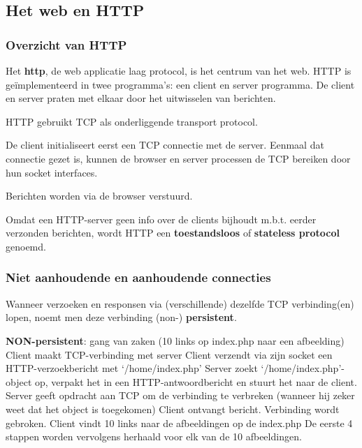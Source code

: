 \subsection{Het web en HTTP}

\subsubsection{Overzicht van HTTP}

Het \textbf{\acrfull{http}}, de web applicatie laag protocol, is het centrum van het web. HTTP is geïmplementeerd in twee programma’s: een client en server programma. De client en server praten met elkaar door het uitwisselen van berichten.

\noindent HTTP gebruikt TCP als onderliggende transport protocol. 

\noindent De client initialiseert eerst een TCP connectie met de server. Eenmaal dat connectie gezet is, kunnen de browser en server processen de TCP bereiken door hun socket interfaces.

\noindent Berichten worden via de browser verstuurd.

\noindent Omdat een HTTP-server geen info over de clients bijhoudt m.b.t. eerder verzonden berichten, wordt HTTP een \textbf{toestandsloos} of \textbf{stateless protocol} genoemd.

\subsubsection{Niet aanhoudende en aanhoudende connecties}


Wanneer verzoeken en responsen via (verschillende) dezelfde TCP verbinding(en) lopen, noemt men deze verbinding (non-) \textbf{persistent}.

\noindent \textbf{NON-persistent}: gang van zaken (10 links op index.php naar een afbeelding)
\be
\itf Client maakt TCP-verbinding met server
\itf Client verzendt via zijn socket een HTTP-verzoekbericht met ‘/home/index.php’
\itf Server zoekt ‘/home/index.php’-object op, verpakt het in een HTTP-antwoordbericht en stuurt het naar de client.
\itf Server geeft opdracht aan TCP om de verbinding te verbreken (wanneer hij zeker weet dat het object is toegekomen)
\itf Client ontvangt bericht. Verbinding wordt gebroken. Client vindt 10 links naar de afbeeldingen op de index.php
\itf De eerste 4 stappen worden vervolgens herhaald voor elk van de 10 afbeeldingen.
\ee

